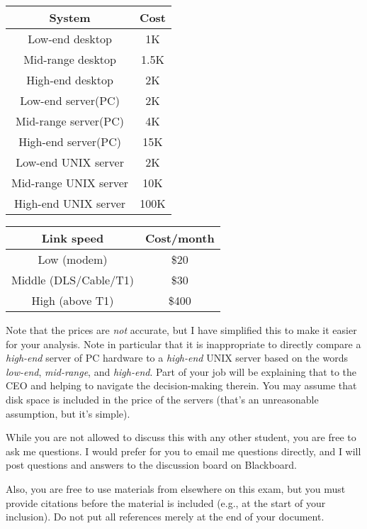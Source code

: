 \documentclass{exam}
\begin{document}
\begin{questions}
\begin{tabular}{|c|c|}
\hline
{\bf System} & {\bf Cost} \\
\hline
Low-end desktop & 1K \\
Mid-range desktop & 1.5K \\
High-end desktop & 2K\\
Low-end server(PC) & 2K \\
Mid-range server(PC) & 4K \\
High-end server(PC) & 15K \\
Low-end UNIX server & 2K \\
Mid-range UNIX server & 10K \\
High-end UNIX server & 100K \\
\hline
\end{tabular}

\vspace{0.5in}

\begin{tabular}{|c|c|}
\hline
{\bf Link speed} & {\bf Cost/month} \\
\hline
Low (modem) & \$20\\
Middle (DLS/Cable/T1) & \$30 \\
High (above T1) & \$400\\
\hline
\end{tabular}
\vspace{0.5in}

Note that the prices are \emph{not} accurate, but I have simplified this
to make it easier for your analysis.  Note in particular that it is 
inappropriate to directly
compare a \emph{high-end} server of PC hardware to a \emph{high-end} UNIX
server based on the words \emph{low-end}, \emph{mid-range}, and 
\emph{high-end}.  Part of your job will be explaining that to the CEO 
and helping to navigate the decision-making therein.  You may
assume that disk space is included in the price of the servers (that's
an unreasonable assumption, but it's simple).

While you are not allowed to discuss this with any other student, you are
free to ask me questions.  I would prefer for you to email me questions
directly, and I will post questions and answers to the discussion board
on Blackboard.

Also, you are free to use materials from elsewhere on this exam, but you
must provide citations before the material is included (e.g., at the start
of your inclusion).  Do not put all references merely at the end of your
document.


\end{questions}
\end{document}
